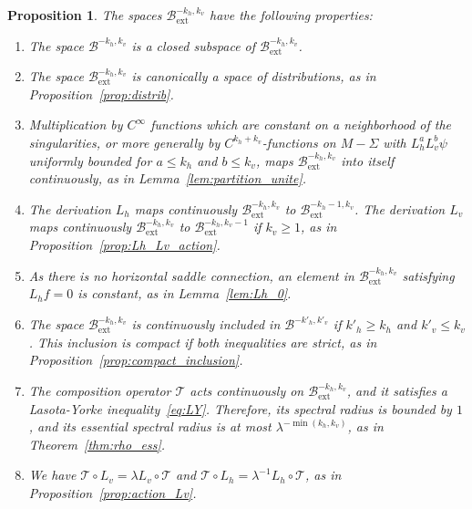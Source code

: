 \documentclass[10pt]{amsart}
\newcommand{\ext}{\mathrm{ext}}
\newcommand{\boB}{\mathcal{B}}
\newcommand{\boT}{\mathcal{T}}
\newtheorem{prop}[thm]{Proposition}
\theoremstyle{definition}
\numberwithin{equation}{section}
\begin{document}
\pagebreak[2]
\begin{prop}
\label{prop:ext} The spaces $\boB_{\ext}^{-k_h, k_v}$ have the following
properties:
\begin{enumerate}
\item The space $\boB^{-k_h, k_v}$ is a closed subspace of
$\boB_{\ext}^{-k_h, k_v}$.
\item The space $\boB_{\ext}^{-k_h, k_v}$ is canonically a space of
distributions, as in Proposition~\ref{prop:distrib}.
\item Multiplication by $C^\infty$ functions which are constant on a
neighborhood of the singularities, or more generally by
$C^{k_h+k_v}$-functions on $M-\Sigma$ with $L_h^a L_v^b \psi$ uniformly
bounded for $a \leq k_h$ and $b \leq k_v$, maps $\boB_{\ext}^{-k_h,
k_v}$ into itself continuously, as in Lemma~\ref{lem:partition_unite}.
\item The derivation $L_h$ maps continuously $\boB_{\ext}^{-k_h, k_v}$ to
$\boB_{\ext}^{-k_h-1, k_v}$. The derivation $L_v$ maps continuously
$\boB_{\ext}^{-k_h, k_v}$ to $\boB_{\ext}^{-k_h, k_v-1}$ if $k_v \geq 1$,
as in Proposition~\ref{prop:Lh_Lv_action}.
\item As there is no horizontal saddle connection, an element in
$\boB_{\ext}^{-k_h, k_v}$ satisfying $L_h f=0$ is constant, as in
Lemma~\ref{lem:Lh_0}.
\item The space $\boB_{\ext}^{-k_h, k_v}$ is continuously included in
$\boB^{-k'_h, k'_v}$ if $k'_h \geq k_h$ and $k'_v\leq k_v$. This
inclusion is compact if both inequalities are strict, as in
Proposition~\ref{prop:compact_inclusion}.
\item \label{prop:Text} The composition operator $\boT$ acts continuously
on $\boB_{\ext}^{-k_h, k_v}$, and it satisfies a Lasota-Yorke
inequality~\eqref{eq:LY}. Therefore, its spectral radius is bounded by
$1$, and its essential spectral radius is at most $\lambda^{-\min(k_h,
k_v)}$, as in Theorem~\ref{thm:rho_ess}.
\item We have $\boT \circ L_v = \lambda L_v \circ \boT$ and $\boT \circ L_h
= \lambda^{-1} L_h\circ \boT$, as in Proposition~\ref{prop:action_Lv}.
\end{enumerate}
\end{prop}
\end{document}
